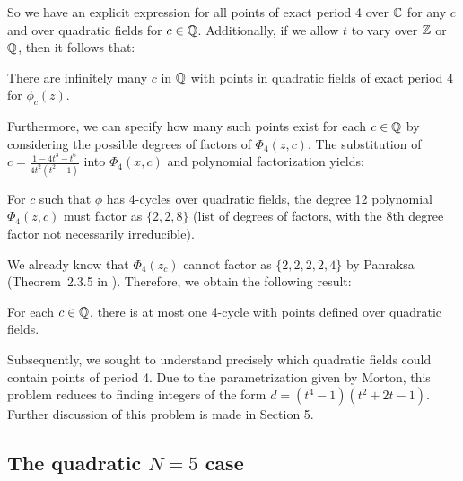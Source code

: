 So we have an explicit expression for all points of exact period 4 over
$\mathbb{C}$ for any $c$ and over quadratic fields for $c \in \mathbb{Q}$. Additionally,
if we allow $t$ to vary over $\mathbb{Z}$ or $\mathbb{Q}$, then it follows that:

\begin{corollary}
	There are infinitely many $c$ in $\mathbb{Q}$ with points in quadratic
	fields of exact period 4 for $\phi_c(z)$.
\end{corollary}

Furthermore, we can specify how many such points exist for each $c
\in \mathbb{Q}$ by considering the possible degrees of factors of $\Phi_4(
z,c)$. The substitution of $c = \frac{1 - 4t^3 - t^6}{4t^2(t^2 - 1)}$
into $\Phi_4(x,c)$ and polynomial factorization yields:

\begin{lemma}
	For $c$ such that $\phi$ has 4-cycles over quadratic fields,
	the degree 12 polynomial $\Phi_4(z,c)$ must factor as $\{2,2,8\}$
	(list of degrees of factors, with the 8th degree factor not
	necessarily irreducible).
\end{lemma}

We already know that $\Phi_4(z_c)$ cannot factor as $\{2,2,2,2,4\}$
by Panraksa (Theorem~2.3.5 in \cite{MR2982105}). Therefore, we
obtain the following result:

\begin{theorem}
	For each $c \in \mathbb{Q}$, there is at most one 4-cycle with points
	defined over quadratic fields.
\end{theorem}

Subsequently, we sought to understand precisely which quadratic
fields could contain points of period 4. Due to the parametrization
given by Morton, this problem reduces to finding integers of the form
$d = (t^4 - 1)(t^2 + 2t - 1)$. Further discussion of this problem is
made in Section 5. %

\subsection{The quadratic $N = 5$ case}

